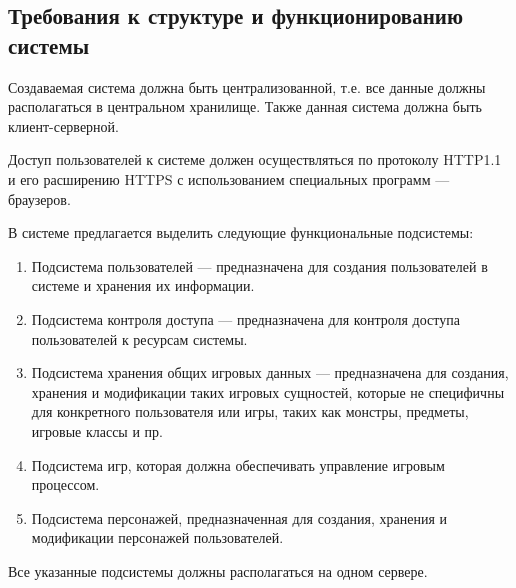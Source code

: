 \subsection{Требования к структуре и функционированию системы}

Создаваемая система должна быть централизованной, т.е. все данные должны располагаться в центральном хранилище. Также данная система должна быть клиент-серверной.

Доступ пользователей к системе должен осуществляться по протоколу HTTP1.1 и его расширению HTTPS с использованием специальных программ --- браузеров.

В системе предлагается выделить следующие функциональные подсистемы:
\begin{enumerate}
\item Подсистема пользователей --- предназначена для создания пользователей в системе и хранения их информации.
\item Подсистема контроля доступа --- предназначена для контроля доступа пользователей к ресурсам системы.
\item Подсистема хранения общих игровых данных --- предназначена для создания, хранения и модификации таких игровых сущностей, которые не специфичны для конкретного пользователя или игры, таких как монстры, предметы, игровые классы и пр.
\item Подсистема игр, которая должна обеспечивать управление игровым процессом.
\item Подсистема персонажей, предназначенная для создания, хранения и модификации персонажей пользователей.
\end{enumerate}

Все указанные подсистемы должны располагаться на одном сервере.
